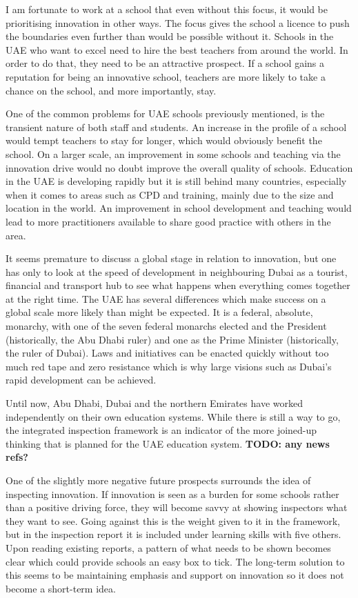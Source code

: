 I am fortunate to work at a school that even without this focus, it would be prioritising innovation in other ways. The focus gives the school a licence to push the boundaries even further than would be possible without it. Schools in the UAE who want to excel need to hire the best teachers from around the world. In order to do that, they need to be an attractive prospect. If a school gains a reputation for being an innovative school, teachers are more likely to take a chance on the school, and more importantly, stay. 

One of the common problems for UAE schools previously mentioned, is the transient nature of both staff and students. An increase in the profile of a school would tempt teachers to stay for longer, which would obviously benefit the school. On a larger scale, an improvement in some schools and teaching via the innovation drive would no doubt improve the overall quality of schools. Education in the UAE is developing rapidly but it is still behind many countries, especially when it comes to areas such as CPD and training, mainly due to the size and location in the world. An improvement in school development and teaching would lead to more practitioners available to share good practice with others in the area.

It seems premature to discuss a global stage in relation to innovation, but one has only to look at the speed of development in neighbouring Dubai as a tourist, financial and transport hub to see what happens when everything comes together at the right time.
The UAE has several differences which make success on a global scale more likely than might be expected. It is a federal, absolute, monarchy, with one of the seven federal monarchs elected and the President (historically, the Abu Dhabi ruler) and one as the Prime Minister (historically, the ruler of Dubai). Laws and initiatives can be enacted quickly without too much red tape and zero resistance which is why large visions such as Dubai’s rapid development can be achieved.

Until now, Abu Dhabi, Dubai and the northern Emirates have worked independently on their own education systems. While there is still a way to go, the integrated inspection framework is an indicator of the more joined-up thinking that is planned for the UAE education system. \textbf{TODO: any news refs?}

One of the slightly more negative future prospects surrounds the idea of inspecting innovation. If innovation is seen as a burden for some schools rather than a positive driving force, they will become savvy at showing inspectors what they want to see. Going against this is the weight given to it in the framework, but in the inspection report it is included under learning skills with five others. Upon reading existing reports, a pattern of what needs to be shown becomes clear which could provide schools an easy box to tick. The long-term solution to this seems to be maintaining emphasis and support on innovation so it does not become a short-term idea. 

